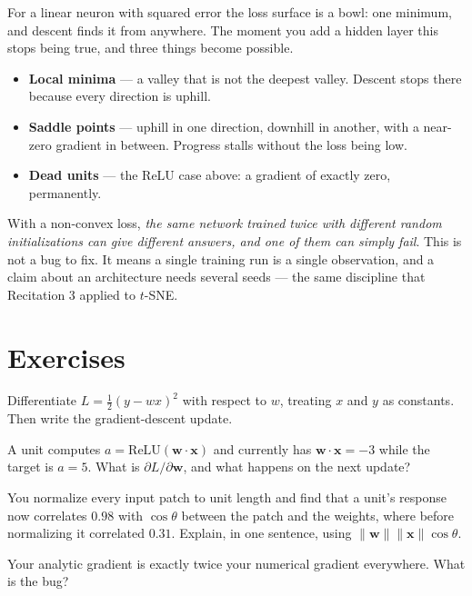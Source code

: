 \documentclass[11pt]{article}
\begin{document}
For a linear neuron with squared error the loss surface is a bowl: one minimum,
and descent finds it from anywhere. The moment you add a hidden layer this stops
being true, and three things become possible.

\begin{itemize}
  \item \textbf{Local minima} --- a valley that is not the deepest valley.
        Descent stops there because every direction is uphill.
  \item \textbf{Saddle points} --- uphill in one direction, downhill in another,
        with a near-zero gradient in between. Progress stalls without the loss
        being low.
  \item \textbf{Dead units} --- the ReLU case above: a gradient of exactly zero,
        permanently.
\end{itemize}

\begin{keybox}
 With a non-convex loss, \emph{the same network
trained twice with different random initializations can give different answers,
and one of them can simply fail}. This is not a bug to fix. It means a single
training run is a single observation, and a claim about an architecture needs
several seeds --- the same discipline that Recitation 3 applied to $t$-SNE.
\end{keybox}

\section{Exercises}

 Differentiate $L = \tfrac{1}{2}(y - wx)^2$ with respect to $w$, treating
$x$ and $y$ as constants. Then write the gradient-descent update.

 A unit computes $a = \mathrm{ReLU}(\boldsymbol{w}\cdot\boldsymbol{x})$
and currently has $\boldsymbol{w}\cdot\boldsymbol{x} = -3$ while the target is
$a = 5$. What is $\partial L/\partial \boldsymbol{w}$, and what happens on the
next update?

 You normalize every input patch to unit length and find that a unit's
response now correlates $0.98$ with $\cos\theta$ between the patch and the
weights, where before normalizing it correlated $0.31$. Explain, in one
sentence, using $\|\boldsymbol{w}\|\|\boldsymbol{x}\|\cos\theta$.

 Your analytic gradient is exactly twice your numerical gradient
everywhere. What is the bug?
\end{document}
